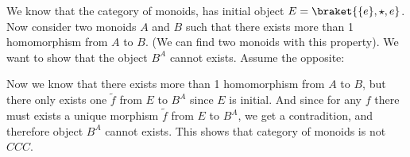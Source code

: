 
    We know that the category of monoids, has initial object $E = \braket{\{e\}, \star , e}$.
    Now consider two monoids $A$ and $B$ such that there exists more than 1 homomorphism from $A$ to $B$. (We can find two monoids with this property). We want to show that the object $B^A$ cannot exists. Assume the opposite:
    \begin{center}
        \end{center}
    Now we know that there exists more than 1 homomorphism from $A$ to $B$, but there only exists one $\tilde{f}$ from $E$ to $B^A$ since $E$ is initial. And since for any $f$ there must exists a unique morphism $\tilde{f}$ from $E$ to $B^A$, we get a contradition, and therefore object $B^A$ cannot exists. This shows that category of monoids is not $CCC$.
